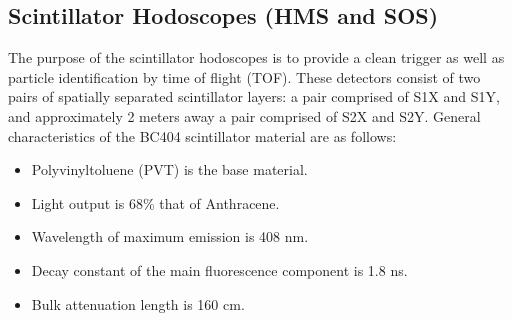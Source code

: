 \subsection{Scintillator Hodoscopes (HMS and SOS)}

The purpose of the scintillator hodoscopes is to provide a clean
trigger as well as particle identification by time of flight (TOF). These
detectors consist of two pairs of spatially separated scintillator
layers: a pair comprised of S1X and S1Y, and approximately 2 meters away a pair
comprised of S2X and S2Y. General characteristics of the BC404 scintillator
material are as follows:

\begin{itemize}
\item{Polyvinyltoluene (PVT) is the base material. }
\item{Light output is 68\% that of Anthracene. }
\item{Wavelength of maximum emission is 408 nm.}
\item{Decay constant of the main fluorescence component is 1.8 ns.}
\item{Bulk attenuation length is 160 cm.}
\end{itemize}

